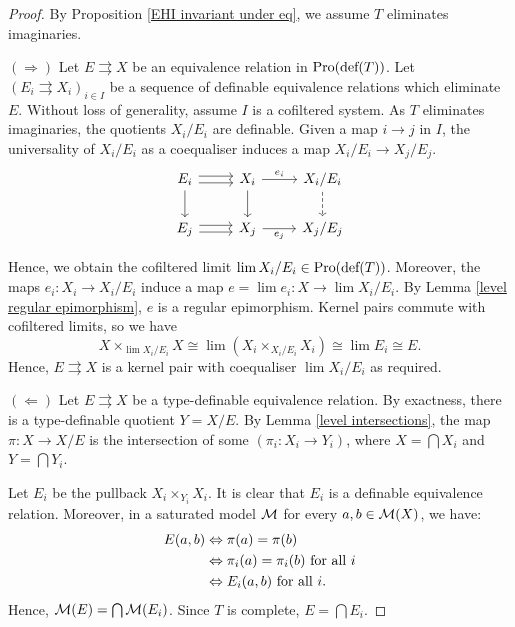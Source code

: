 \begin{proof}
    By Proposition \ref{EHI invariant under eq}, we assume $T$ eliminates imaginaries.

\smallskip

    $(\Rightarrow)$ \quad Let $E\rightrightarrows X$ be an equivalence relation in $\textup{Pro}(\textup{def}(T))$. Let $(E_i\rightrightarrows X_i)_{i\in I}$ be a sequence of definable equivalence relations which eliminate $E$. Without loss of generality, assume $I$ is a cofiltered system. As $T$ eliminates imaginaries, the quotients $X_i/E_i$ are definable. Given a map $i\rightarrow j$ in $I$,  the universality of $X_i/E_i$ as a coequaliser induces a map $X_i/E_i\rightarrow X_j/E_j$. 
\[\begin{tikzcd}
	{E_i} & {X_i} & {X_i/E_i} \\
	{E_j} & {X_j} & {X_j/E_j}
	\arrow[shift right, from=1-1, to=1-2]
	\arrow[shift left, from=1-1, to=1-2]
	\arrow[from=1-1, to=2-1]
	\arrow["{e_i}", from=1-2, to=1-3]
	\arrow[from=1-2, to=2-2]
	\arrow[dashed, from=1-3, to=2-3]
	\arrow[shift right, from=2-1, to=2-2]
	\arrow[shift left, from=2-1, to=2-2]
	\arrow["{e_j}"', from=2-2, to=2-3]
\end{tikzcd}\]

    Hence, we obtain the cofiltered limit $\lim X_i/E_i \in \textup{Pro}(\textup{def}(T))$. Moreover, the maps $e_i:X_i \rightarrow X_i/E_i$ induce a map $e=\lim e_i:X\rightarrow \lim X_i/E_i$. By Lemma \ref{level regular epimorphism}, $e$ is a regular epimorphism. Kernel pairs commute with cofiltered limits, so we have
    \[ X\times_{\lim X_i/E_i} X 
    \cong \lim (X_i\times_{X_i/E_i}X_i) 
    \cong \lim E_i
    \cong E.\]
    Hence, $E\rightrightarrows X$ is a kernel pair with coequaliser $\lim X_i/E_i$ as required.

    \smallskip

    $(\Leftarrow)$ \quad Let $E\rightrightarrows X$ be a type-definable equivalence relation. By exactness, there is a type-definable quotient $Y = X/E$. By Lemma \ref{level intersections}, the map $\pi:X\rightarrow X/E$ is the intersection of some $(\pi_i:X_i\rightarrow Y_i)$, where $X=\bigcap X_i$ and $Y=\bigcap Y_i$.

    Let $E_i$ be the pullback $X_i \times_{Y_i} X_i$. It is clear that $E_i$ is a definable equivalence relation. Moreover, in a saturated model $\mathcal{M}$ for every $a,b\in \mathcal{M}(X)$, we have:
    \begin{align*}
        E(a,b) &\Leftrightarrow \pi(a)=\pi(b) \\
        &\Leftrightarrow \pi_i(a)=\pi_i(b)  \textup{ for all } i \\
        &\Leftrightarrow E_i(a,b) \textup{ for all } i.
    \end{align*}
    Hence, $\mathcal{M}(E)=\bigcap \mathcal{M}(E_i)$. Since $T$ is complete, $E=\bigcap E_i$.
\end{proof}

